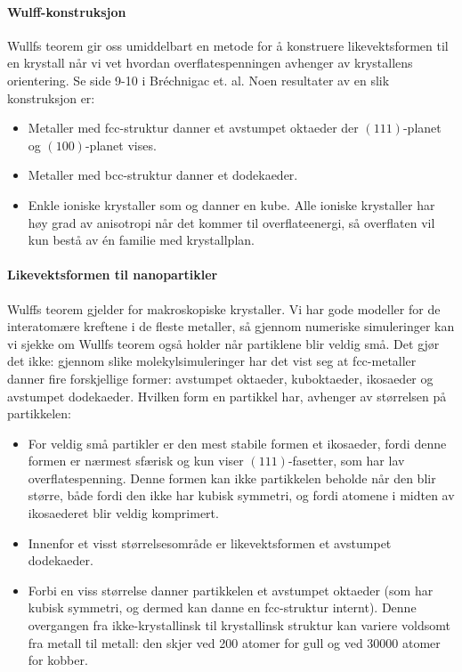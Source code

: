 \paragraph{Wulff-konstruksjon} Wullfs teorem gir oss umiddelbart en metode for å konstruere likevektsformen til en krystall når vi vet hvordan overflatespenningen avhenger av krystallens orientering. Se side 9-10 i Bréchnigac et. al. Noen resultater av en slik konstruksjon er:
\begin{itemize}
	\item Metaller med fcc-struktur danner et avstumpet oktaeder der $(111)$-planet og $(100)$-planet vises.
	\item Metaller med bcc-struktur danner et dodekaeder.
	\item Enkle ioniske krystaller som  og  danner en kube. Alle ioniske krystaller har høy grad av anisotropi når det kommer til overflateenergi, så overflaten vil kun bestå av én familie med krystallplan.
\end{itemize}

\paragraph{Likevektsformen til nanopartikler} Wulffs teorem gjelder for makroskopiske krystaller. Vi har gode modeller for de interatomære kreftene i de fleste metaller, så gjennom numeriske simuleringer kan vi sjekke om Wullfs teorem også holder når partiklene blir veldig små. Det gjør det ikke: gjennom slike molekylsimuleringer har det vist seg at fcc-metaller danner fire forskjellige former: avstumpet oktaeder, kuboktaeder, ikosaeder og avstumpet dodekaeder. Hvilken form en partikkel har, avhenger av størrelsen på partikkelen:
\begin{itemize}
	\item For veldig små partikler er den mest stabile formen et ikosaeder, fordi denne formen er nærmest sfærisk og kun viser $(111)$-fasetter, som har lav overflatespenning. Denne formen kan ikke partikkelen beholde når den blir større, både fordi den ikke har kubisk symmetri, og fordi atomene i midten av ikosaederet blir veldig komprimert.
	\item Innenfor et visst størrelsesområde er likevektsformen et avstumpet dodekaeder.
	\item Forbi en viss størrelse danner partikkelen et avstumpet oktaeder (som har kubisk symmetri, og dermed kan danne en fcc-struktur internt). Denne overgangen fra ikke-krystallinsk til krystallinsk struktur kan variere voldsomt fra metall til metall: den skjer ved 200 atomer for gull og ved 30000 atomer for kobber.
\end{itemize}

